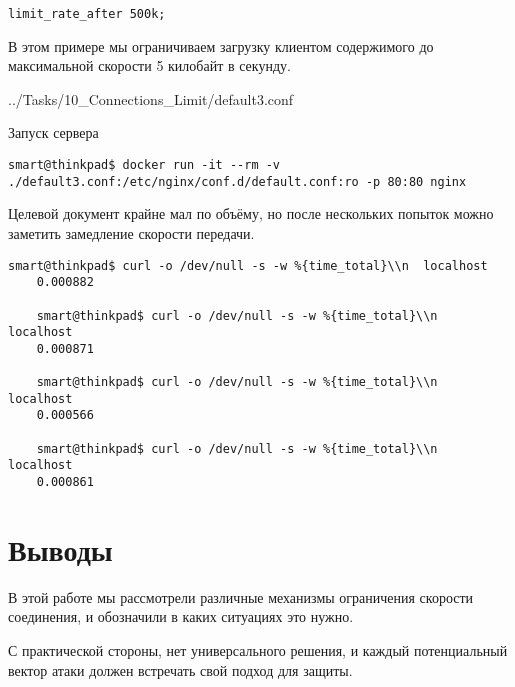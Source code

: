 \texttt{limit\_rate\_after 500k;}

В этом примере мы ограничиваем загрузку клиентом содержимого до максимальной скорости 5 килобайт в секунду.

{../Tasks/10_Connections_Limit/default3.conf}

Запуск сервера
\begin{lstlisting}[style=CommandLineStyle]
    smart@thinkpad$ docker run -it --rm -v ./default3.conf:/etc/nginx/conf.d/default.conf:ro -p 80:80 nginx
\end{lstlisting}

Целевой документ крайне мал по объёму, но после нескольких попыток можно заметить замедление скорости передачи.
\begin{lstlisting}[style=CommandLineStyle]
    smart@thinkpad$ curl -o /dev/null -s -w %{time_total}\\n  localhost
    0.000882

    smart@thinkpad$ curl -o /dev/null -s -w %{time_total}\\n  localhost
    0.000871

    smart@thinkpad$ curl -o /dev/null -s -w %{time_total}\\n  localhost
    0.000566

    smart@thinkpad$ curl -o /dev/null -s -w %{time_total}\\n  localhost
    0.000861
\end{lstlisting}

\section*{Выводы}

В этой работе мы рассмотрели различные механизмы ограничения скорости соединения, и обозначили в каких ситуациях это нужно.

С практической стороны, нет универсального решения, и каждый потенциальный вектор атаки должен встречать свой подход для защиты.
